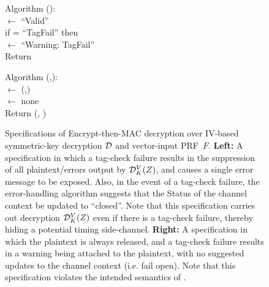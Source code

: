 \begin{figure}
{\medskip
Algorithm ():\\
\nudge {} $\gets$ ``Valid''\\
\nudge if  =  ``TagFail'' then\\ 
\nudge\nudge {} $\gets$ ``Warning: TagFail''\\
\nudge Return 

\medskip
Algorithm (,):\\
\nudge {} $\gets$ (,)\\
\nudge {} $\gets$ none \\
\nudge Return (, )
} 
\caption{Specifications of Encrypt-then-MAC decryption over IV-based
  symmetric-key decryption $\mathcal{D}$ and vector-input PRF~$F$.   {\bf
    Left:} A specification in which a tag-check failure results in the
suppression of all plaintext/errors output by $\mathcal{D}^V_K(Z)$, and
causes a single error message to be exposed.  Also,
in the event of a tag-check failure, the error-handling algorithm
suggests that the Status of the channel context be updated to
``closed''.  Note that this specification carries out decryption
$\mathcal{D}^V_K(Z)$ even if there is a tag-check failure, thereby hiding a
potential timing side-channel. 
%
{\bf
  Right: } A specification in which the plaintext is always released,
and a tag-check failure results in a warning being attached to the
plaintext, with no suggested updates to the channel context
(i.e. fail open).  Note that this specification violates the intended
semantics of .}
\label{fig:EtM-aead}
\end{figure}
